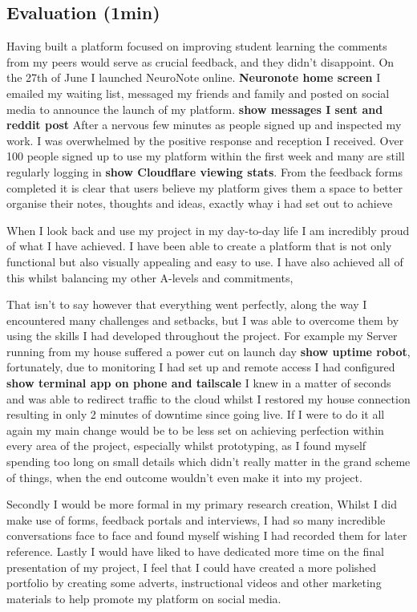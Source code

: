 \subsection*{Evaluation (1min)}
Having built a platform focused on improving student learning the comments from my peers would serve as crucial feedback, and they didn't disappoint. On the 27th of June I launched NeuroNote online. \textbf{Neuronote home screen} I emailed my waiting list, messaged my friends and family and posted on social media to announce the launch of my platform. \textbf{show messages I sent and reddit post} After a nervous few minutes as people signed up and inspected my work. I was overwhelmed by the positive response and reception I received. Over 100 people signed up to use my platform within the first week and many are still regularly logging in \textbf{show Cloudflare viewing stats}. From the feedback forms completed it is clear that users believe my platform gives them a space to better organise their notes, thoughts and ideas, exactly whay i had set out to achieve

When I look back and use my project in my day-to-day life I am incredibly proud of what I have achieved. I have been able to create a platform that is not only functional but also visually appealing and easy to use. I have also achieved all of this whilst balancing my other A-levels and commitments, 

That isn't to say however that everything went perfectly, along the way I encountered many challenges and setbacks, but I was able to overcome them by using the skills I had developed throughout the project. For example my Server running from my house suffered a power cut on launch day \textbf{show uptime robot}, fortunately, due to monitoring I had set up and remote access I had configured  \textbf{show terminal app on phone and tailscale} I knew in a matter of seconds and was able to redirect traffic to the cloud whilst I restored my house connection resulting in only 2 minutes of downtime since going live. If I were to do it all again my main change would be to be less set on achieving perfection within every area of the project, especially whilst prototyping, as I found myself spending too long on small details which didn't really matter in the grand scheme of things, when the end outcome wouldn't even make it into my project. 

   Secondly I would be more formal in my primary research creation, Whilst I did make use of forms, feedback portals and interviews, I had so many incredible conversations face to face and found myself wishing I had recorded them for later reference. Lastly I would have liked to have dedicated more time on the final presentation of my project, I feel that I could have created a more polished portfolio by creating some adverts, instructional videos and other marketing materials to help promote my platform on social media.


